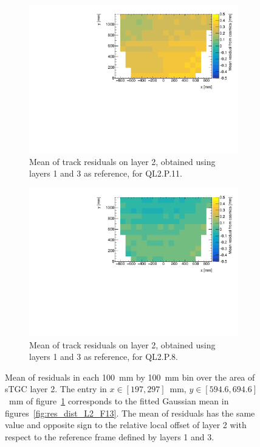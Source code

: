 \newpage
\thispagestyle{empty}
\begin{figure}
\centering
\begin{subfigure}{\textwidth}
  \centering
  \includegraphics[width=\linewidth]{figures/figure_QL2P11_3100V_2021-08-05_th2_means_layer2_fixedlayers13.pdf}
  \caption{Mean of track residuals on layer 2, obtained using layers 1 and 3 as reference, for QL2.P.11.}
  \label{fig:res_mean_th2_ql2p11}
\end{subfigure}%
\vspace*{\floatsep}
\begin{subfigure}{\textwidth}
  \centering
  \includegraphics[width=\linewidth]{figures/figure_QL2P08_3100V_2021-08-03_th2_means_layer2_fixedlayers13.pdf}
  \caption{Mean of track residuals on layer 2, obtained using layers 1 and 3 as reference, for QL2.P.8.}
  \label{fig:res_mean_th2_ql2p8}
\end{subfigure}
\caption{Mean of residuals in each \SI{100}{\milli\meter} by \SI{100}{\milli\meter} bin over the area of sTGC layer 2. The entry in $x\in\left[197, 297\right]$~mm,  $y\in\left[594.6, 694.6\right]$~mm of figure~\ref{fig:res_mean_th2_ql2p11} corresponds to the fitted Gaussian mean in figures~\ref{fig:res_dist_L2_F13}. The mean of residuals has the same value and opposite sign to the relative local offset of layer 2 with respect to the reference frame defined by layers 1 and 3.}
\label{fig:res_mean_th2}
\end{figure}
\newpage
\restoregeometry

